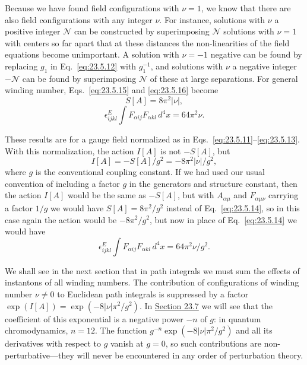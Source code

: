 Because we have found field configurations with $\nu=1$, we know that
there are also field configurations with any integer $\nu$. For instance,
solutions with $\nu$ a positive integer $\mathcal N$ can be constructed
by superimposing $\mathcal N$ solutions with $\nu=1$ with centers so far
apart that at these distances the non-linearities of the field equations
become unimportant. A solution with $\nu=-1$ negative can be found by
replacing $g_1$ in Eq.~\eqref{eq:23.5.12} with $g_1^{-1}$, and solutions
with $\nu$ a negative integer $-\mathcal N$ can be found by
superimposing $\mathcal N$ of these at large separations. For general
winding number, Eqs.~\eqref{eq:23.5.15} and \eqref{eq:23.5.16} become
\begin{equation}
S[A]=8\pi^2|\nu|,
\tag{23.5.17}\label{eq:23.5.17}
\end{equation}
\begin{equation}
\epsilon^E_{ijkl}\int F_{\alpha ij}F_{\alpha kl}\,d^4x=64\pi^2\nu.
\tag{23.5.18}\label{eq:23.5.18}
\end{equation}

These results are for a gauge field normalized as in
Eqs.~\eqref{eq:23.5.11}--\eqref{eq:23.5.13}. With this normalization,
the action $I[A]$ is not $-S[A]$, but
\begin{equation}
I[A]=-S[A]/g^2=-8\pi^2|\nu|/g^2,
\tag{23.5.19}\label{eq:23.5.19}
\end{equation}
where $g$ is the conventional coupling constant. If we had used our usual
convention of including a factor $g$ in the generators and structure
constant, then the action $I[A]$ would be the same as $-S[A]$, but with
$A_{\alpha\mu}$ and $F_{\alpha\mu\nu}$ carrying a factor $1/g$ we would
have $S[A]=8\pi^2/g^2$ instead of Eq.~\eqref{eq:23.5.14}, so in this
case again the action would be $-8\pi^2/g^2$, but now in place of
Eq.~\eqref{eq:23.5.14} we would have
\begin{equation}
\epsilon^E_{ijkl}\int F_{\alpha ij}F_{\alpha kl}\,d^4x
=64\pi^2\nu/g^2.
\tag{23.5.20}\label{eq:23.5.20}
\end{equation}

We shall see in the next section that in path integrals we must sum the
effects of instantons of all winding numbers. The contribution of
configurations of winding number $\nu\ne0$ to Euclidean path integrals is
suppressed by a factor
$\exp(I[A])=\exp(-8|\nu|\pi^2/g^2)$. In \hyperref[sec:23.7]{Section 23.7} we will see that
the coefficient of this exponential is a negative power $-n$ of $g$: in
quantum chromodynamics, $n=12$. The function
$g^{-n}\exp(-8|\nu|\pi^2/g^2)$ and all its derivatives with respect to
$g$ vanish at $g=0$, so such contributions are non-perturbative---they
will never be encountered in any order of perturbation theory.

